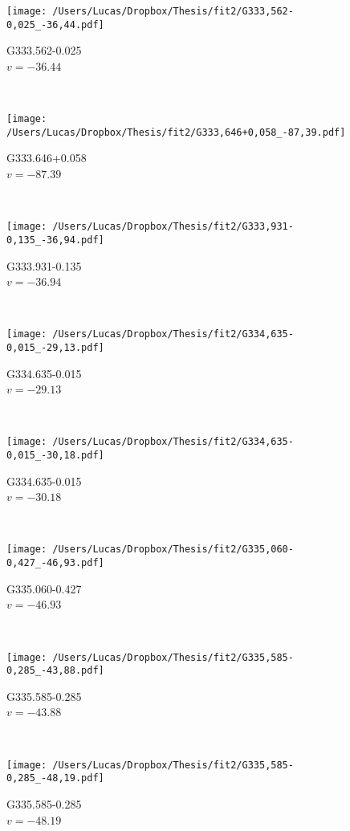 \begin{figure*}[t]\ContinuedFloat
	\centering
	\begin{subfigure}[t]{0.3\textwidth}
		\texttt{[image: /Users/Lucas/Dropbox/Thesis/fit2/G333,562-0,025\_-36,44.pdf]}
		\caption[]{G333.562-0.025\\$v=-36.44$\,\kms}
	\end{subfigure}
	~
	\begin{subfigure}[t]{0.3\textwidth}
		\texttt{[image: /Users/Lucas/Dropbox/Thesis/fit2/G333,646+0,058\_-87,39.pdf]}
		\caption[]{G333.646+0.058\\$v=-87.39$\,\kms}
	\end{subfigure}
	~
	\begin{subfigure}[t]{0.3\textwidth}
		\texttt{[image: /Users/Lucas/Dropbox/Thesis/fit2/G333,931-0,135\_-36,94.pdf]}
		\caption[]{G333.931-0.135\\$v=-36.94$\,\kms}
	\end{subfigure}
	~
	\begin{subfigure}[t]{0.3\textwidth}
		\texttt{[image: /Users/Lucas/Dropbox/Thesis/fit2/G334,635-0,015\_-29,13.pdf]}
		\caption[]{G334.635-0.015\\$v=-29.13$\,\kms}
	\end{subfigure}
	~
	\begin{subfigure}[t]{0.3\textwidth}
		\texttt{[image: /Users/Lucas/Dropbox/Thesis/fit2/G334,635-0,015\_-30,18.pdf]}
		\caption[]{G334.635-0.015\\$v=-30.18$\,\kms}
	\end{subfigure}
	~
	\begin{subfigure}[t]{0.3\textwidth}
		\texttt{[image: /Users/Lucas/Dropbox/Thesis/fit2/G335,060-0,427\_-46,93.pdf]}
		\caption[]{G335.060-0.427\\$v=-46.93$\,\kms}
	\end{subfigure}
	~
	\begin{subfigure}[t]{0.3\textwidth}
		\texttt{[image: /Users/Lucas/Dropbox/Thesis/fit2/G335,585-0,285\_-43,88.pdf]}
		\caption[]{G335.585-0.285\\$v=-43.88$\,\kms}
	\end{subfigure}
	~
	\begin{subfigure}[t]{0.3\textwidth}
		\texttt{[image: /Users/Lucas/Dropbox/Thesis/fit2/G335,585-0,285\_-48,19.pdf]}
		\caption[]{G335.585-0.285\\$v=-48.19$\,\kms}

\end{subfigure}
\end{figure*}
